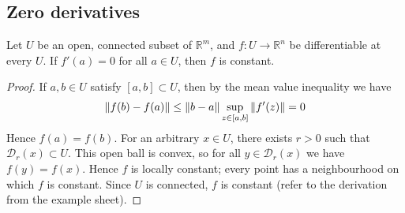 \subsection{Zero derivatives}
\begin{corollary}
	Let \( U \) be an open, connected subset of \( \mathbb R^m \), and \( f \colon U \to \mathbb R^n \) be differentiable at every \( U \).
	If \( f'(a) = 0 \) for all \( a \in U \), then \( f \) is constant.
\end{corollary}
\begin{proof}
	If \( a, b \in U \) satisfy \( [a,b] \subset U \), then by the mean value inequality we have
	\[
		\norm{f(b) - f(a)} \leq \norm{b-a} \sup_{z \in [a,b]} \norm{f'(z)} = 0
	\]
	Hence \( f(a) = f(b) \).
	For an arbitrary \( x \in U \), there exists \( r > 0 \) such that \( \mathcal D_r(x) \subset U \).
	This open ball is convex, so for all \( y \in \mathcal D_r(x) \) we have \( f(y) = f(x) \).
	Hence \( f \) is locally constant; every point has a neighbourhood on which \( f \) is constant.
	Since \( U \) is connected, \( f \) is constant (refer to the derivation from the example sheet).
\end{proof}

